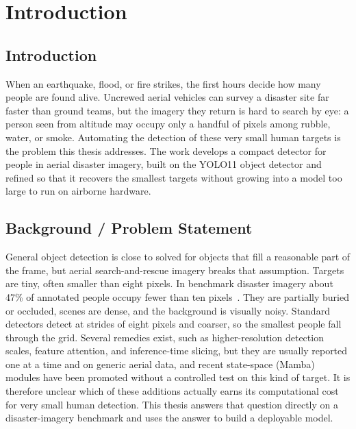 \chapter{Introduction}

\section{Introduction}
When an earthquake, flood, or fire strikes, the first hours decide how many people
are found alive. Uncrewed aerial vehicles can survey a disaster site far faster
than ground teams, but the imagery they return is hard to search by eye: a person
seen from altitude may occupy only a handful of pixels among rubble, water, or
smoke. Automating the detection of these very small human targets is the problem
this thesis addresses. The work develops a compact detector for people in aerial
disaster imagery, built on the YOLO11 object detector and refined so that it
recovers the smallest targets without growing into a model too large to run on
airborne hardware.

\section{Background / Problem Statement}
General object detection is close to solved for objects that fill a reasonable part
of the frame, but aerial search-and-rescue imagery breaks that assumption. Targets
are tiny, often smaller than eight pixels. In benchmark disaster imagery about
47\% of annotated people occupy fewer than ten pixels~\cite{nihal2024c2a}. They are
partially buried or occluded, scenes are dense, and the background is visually noisy. Standard detectors detect
at strides of eight pixels and coarser, so the smallest people fall through the
grid. Several remedies exist, such as higher-resolution detection scales, feature
attention, and inference-time slicing, but they are usually reported one at a
time and on generic aerial data, and recent state-space (Mamba) modules have been
promoted without a controlled test on this kind of target. It is therefore unclear
which of these additions actually earns its computational cost for very small human
detection. This thesis answers that question directly on a disaster-imagery
benchmark and uses the answer to build a deployable model.

